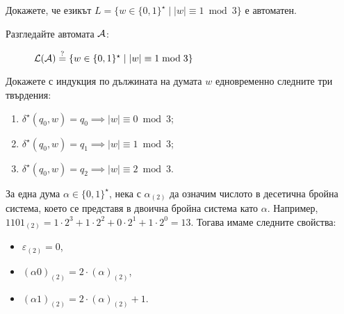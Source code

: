 \begin{problem}
  Докажете, че езикът $L = \{w \in \{0,1\}^\star \mid |w| \equiv 1 \bmod 3\}$ е автоматен.
\end{problem}
\begin{hint}
  Разгледайте автомата $\mathcal{A}$:
  \begin{figure}[H]
    \begin{center}
      \end{center}
      \caption{$\mathcal{L}(\mathcal{A}) \stackrel{?}{=} \{w\in\{0,1\}^\star \mid |w| \equiv 1 \bmod 3\}$}
 \end{figure}  
 Докажете с индукция по дължината на думата $w$ едновременно следните три твърдения:
 \begin{enumerate}[(1)]
 \item
   $\delta^\star(q_0, w) = q_0 \implies |w| \equiv 0 \bmod 3$;
 \item 
   $\delta^\star(q_0, w) = q_1 \implies |w| \equiv 1 \bmod 3$;
 \item
   $\delta^\star(q_0, w) = q_2 \implies |w| \equiv 2 \bmod 3$.
 \end{enumerate}
\end{hint}

За една дума $\alpha \in \{0,1\}^\star$, 
нека с $\alpha_{(2)}$ да означим числото в десетична бройна система, което се представя в двоична бройна система като $\alpha$.
Например, $1101_{(2)} = 1 \cdot 2^3+1\cdot 2^2+0\cdot 2^1+1\cdot 2^0 = 13$.
Тогава имаме следните свойства:
\begin{itemize}
\item
  $\varepsilon_{(2)} = 0$,
\item
  $(\alpha0)_{(2)} = 2\cdot(\alpha)_{(2)}$,
\item
  $(\alpha1)_{(2)} = 2\cdot(\alpha)_{(2)} + 1$.
\end{itemize}

